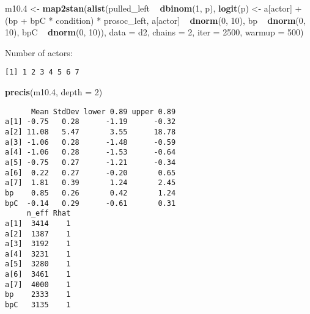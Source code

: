 \documentclass[]{tufte-handout}
\newenvironment{Shaded}{}{}
\newcommand{\KeywordTok}[1]{\textcolor[rgb]{0.00,0.44,0.13}{\textbf{#1}}}
\newcommand{\DataTypeTok}[1]{\textcolor[rgb]{0.56,0.13,0.00}{#1}}
\newcommand{\DecValTok}[1]{\textcolor[rgb]{0.25,0.63,0.44}{#1}}
\newcommand{\FloatTok}[1]{\textcolor[rgb]{0.25,0.63,0.44}{#1}}
\newcommand{\StringTok}[1]{\textcolor[rgb]{0.25,0.44,0.63}{#1}}
\newcommand{\OperatorTok}[1]{\textcolor[rgb]{0.40,0.40,0.40}{#1}}
\newcommand{\NormalTok}[1]{#1}
\begin{document}
\begin{Shaded}
\begin{Highlighting}[]
\NormalTok{m10}\FloatTok{.4}\NormalTok{ <-}\StringTok{ }\KeywordTok{map2stan}\NormalTok{(}\KeywordTok{alist}\NormalTok{(pulled_left }\OperatorTok{~}\StringTok{ }\KeywordTok{dbinom}\NormalTok{(}\DecValTok{1}\NormalTok{, }
\NormalTok{    p), }\KeywordTok{logit}\NormalTok{(p) <-}\StringTok{ }\NormalTok{a[actor] }\OperatorTok{+}\StringTok{ }\NormalTok{(bp }\OperatorTok{+}\StringTok{ }\NormalTok{bpC }\OperatorTok{*}\StringTok{ }\NormalTok{condition) }\OperatorTok{*}\StringTok{ }
\StringTok{    }\NormalTok{prosoc_left, a[actor] }\OperatorTok{~}\StringTok{ }\KeywordTok{dnorm}\NormalTok{(}\DecValTok{0}\NormalTok{, }\DecValTok{10}\NormalTok{), bp }\OperatorTok{~}\StringTok{ }
\StringTok{    }\KeywordTok{dnorm}\NormalTok{(}\DecValTok{0}\NormalTok{, }\DecValTok{10}\NormalTok{), bpC }\OperatorTok{~}\StringTok{ }\KeywordTok{dnorm}\NormalTok{(}\DecValTok{0}\NormalTok{, }\DecValTok{10}\NormalTok{)), }\DataTypeTok{data =}\NormalTok{ d2, }
    \DataTypeTok{chains =} \DecValTok{2}\NormalTok{, }\DataTypeTok{iter =} \DecValTok{2500}\NormalTok{, }\DataTypeTok{warmup =} \DecValTok{500}\NormalTok{)}
\end{Highlighting}
\end{Shaded}

Number of actors:

\begin{Shaded}
\end{Shaded}

\begin{verbatim}
[1] 1 2 3 4 5 6 7
\end{verbatim}

\begin{Shaded}
\begin{Highlighting}[]
\KeywordTok{precis}\NormalTok{(m10}\FloatTok{.4}\NormalTok{, }\DataTypeTok{depth =} \DecValTok{2}\NormalTok{)}
\end{Highlighting}
\end{Shaded}

\begin{verbatim}
      Mean StdDev lower 0.89 upper 0.89
a[1] -0.75   0.28      -1.19      -0.32
a[2] 11.08   5.47       3.55      18.78
a[3] -1.06   0.28      -1.48      -0.59
a[4] -1.06   0.28      -1.53      -0.64
a[5] -0.75   0.27      -1.21      -0.34
a[6]  0.22   0.27      -0.20       0.65
a[7]  1.81   0.39       1.24       2.45
bp    0.85   0.26       0.42       1.24
bpC  -0.14   0.29      -0.61       0.31
     n_eff Rhat
a[1]  3414    1
a[2]  1387    1
a[3]  3192    1
a[4]  3231    1
a[5]  3280    1
a[6]  3461    1
a[7]  4000    1
bp    2333    1
bpC   3135    1
\end{verbatim}
\end{document}
